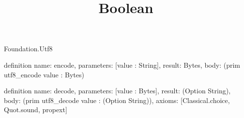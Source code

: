 \begin{lexlean}{Foundation.Utf8}
\title{Boolean}
\begin{semanticmodule}
definition{
  name: encode,
  parameters: [value : String],
  result: Bytes,
  body: (prim utf8_encode value : Bytes)
}

definition{
  name: decode,
  parameters: [value : Bytes],
  result: (Option String),
  body: (prim utf8_decode value : (Option String)),
  axioms: [Classical.choice, Quot.sound, propext]
}
\end{semanticmodule}
\end{lexlean}
